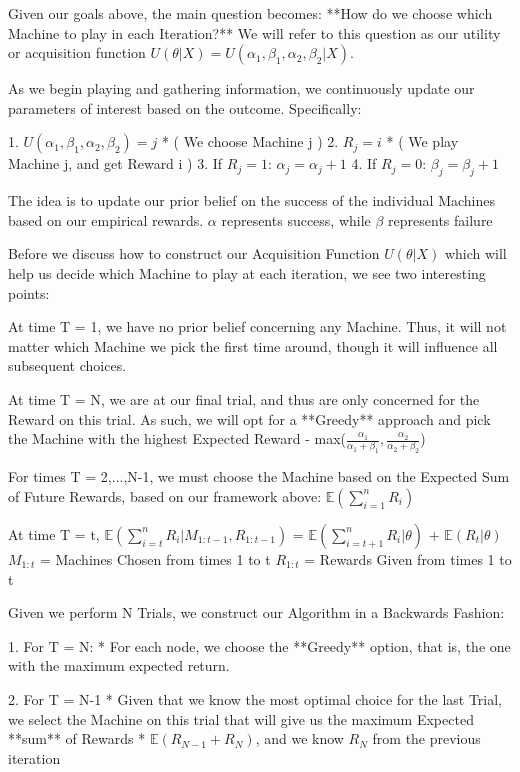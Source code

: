 \documentclass{article}
\begin{document}
Given our goals above, the main question becomes: **How do we choose which Machine to play in each Iteration?** We will refer to this question as our utility or acquisition function $U(\theta | X) = U(\alpha_1, \beta_1, \alpha_2, \beta_2 | X)$.

As we begin playing and gathering information, we continuously update our parameters of interest based on the outcome. Specifically:

1. $U(\alpha_1, \beta_1, \alpha_2, \beta_2) = j$ 
    * ( We choose Machine j )
2. $R_j = i$  
    * ( We play Machine j, and get Reward i )
3. If $R_j = 1$:
    $\alpha_j = \alpha_j + 1$  
4. If $R_j = 0$:
    $\beta_j = \beta_j + 1$  

The idea is to update our prior belief on the success of the individual Machines based on our empirical rewards. $\alpha$ represents success, while $\beta$ represents failure

Before we discuss how to construct our Acquisition Function $U(\theta|X)$ which will help us decide which Machine to play at each iteration, we see two interesting points:

At time T = 1, we have no prior belief concerning any Machine. Thus, it will not matter which Machine we pick the first time around, though it will influence all subsequent choices.

At time T = N, we are at our final trial, and thus are only concerned for the Reward on this trial. As such, we will opt for a **Greedy** approach and pick the Machine with the highest Expected Reward - max($\frac{\alpha_1}{\alpha_1 + \beta_1}, \frac{\alpha_2}{\alpha_2 + \beta_2}$)

For times T = 2,...,N-1, we must choose the Machine based on the Expected Sum of Future Rewards, based on our framework above: $\mathbb{E}(\displaystyle\sum_{i=1}^{n} R_i)$

At time T = t, $\mathbb{E}(\displaystyle\sum_{i=t}^{n} R_i|M_{1:t-1}, R_{1:t-1})$ = $\mathbb{E}(\displaystyle\sum_{i=t+1}^{n} R_i|\theta)$ + $\mathbb{E}(R_t|\theta)$  
$M_{1:t}$ = Machines Chosen from times 1 to t  
$R_{1:t}$ = Rewards Given from times 1 to t

Given we perform N Trials, we construct our Algorithm in a Backwards Fashion:

1. For T = N:
    * For each node, we choose the **Greedy** option, that is, the one with the maximum expected return.

2. For T = N-1
    * Given that we know the most optimal choice for the last Trial, we select the Machine on this trial that will give us the maximum Expected **sum** of Rewards
    * $\mathbb{E}(R_{N-1} + R_{N})$, and we know $R_N$ from the previous iteration
    
\end{document}
